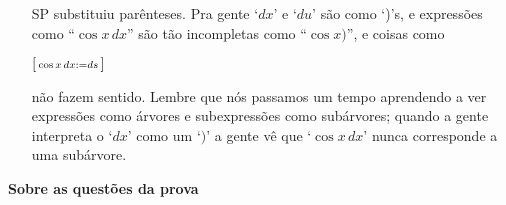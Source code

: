 \documentclass[oneside,12pt]{article}
\begin{document}
{{\begin{itemize}
\item[SP] substituiu parênteses. Pra gente `$dx$' e `$du$' são como
  `)'s, e expressões como ``$\cos x \, dx$'' são tão incompletas como
  ``$\cos x)$'', e coisas como

  $\left [\begin{smallmatrix}\cos x\,dx := ds\end{smallmatrix}\right ]$

  não fazem sentido. Lembre que nós passamos um tempo aprendendo a ver
  expressões como árvores e subexpressões como subárvores; quando a
  gente interpreta o `$dx$' como um `$)$' a gente vê que
  `$\cos x\,dx$' nunca corresponde a uma subárvore.

\end{itemize}

}}

\newpage


{\bf Sobre as questões da prova}
\end{document}
